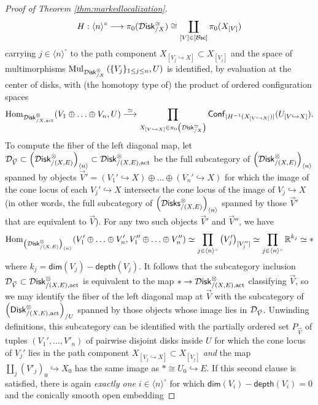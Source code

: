 \documentclass[10pt, reqno, twoside
, final
]{amsart}
\numberwithin{equation}{subsection}%
\theoremstyle{definition}
\theoremstyle{definition}
\theoremstyle{definition}
\theoremstyle{definition}
\theoremstyle{definition}
\theoremstyle{definition}
\theoremstyle{definition}
\theoremstyle{definition}
\theoremstyle{definition}
\theoremstyle{plain}
\theoremstyle{definition}
\theoremstyle{plain}
\theoremstyle{definition}
\theoremstyle{plain}
\theoremstyle{definition}
\theoremstyle{definition}
\theoremstyle{plain}
\theoremstyle{plain}
\theoremstyle{definition}
\theoremstyle{plain}
\theoremstyle{plain}
\theoremstyle{plain}
\begin{document}
\begin{proof}[Proof of Theorem \ref{thm:markedlocalization}]
\[ H:\langle n\rangle^{\circ} \longrightarrow \pi_0(\mathcal{D}\mathsf{isk}^{\simeq}_{/X})\cong \coprod_{[V]\in[\mathcal{B}\mathsf{sc}]}\pi_0(X_{[V]})   \]
carrying $j\in \langle n\rangle^{\circ}$ to the path component $X_{[V_j\hookrightarrow X ]} \subset X_{[V_j]}$ and the space of multimorphisms $\mathrm{Mul}_{\mathcal{D}\mathsf{isk}_{/X}^{\otimes}}\left(\{V_j\}_{1\leq j\leq n},U\right)$ is identified, by evaluation at the center of disks, with (the homotopy type of) the product of ordered configuration spaces
\[ \mathrm{Hom}_{\mathcal{D}\mathsf{isk}_{/X,\mathrm{act}}^{\otimes} }(V_1\oplus \ldots\oplus V_n,U)  \overset{\simeq}{\longrightarrow} \prod_{X_{[V\hookrightarrow X]}\in\pi_0\left(\mathcal{D}\mathsf{isk}^{\simeq}_{/X}\right)} \mathsf{Conf}_{|H^{-1}(X_{[V\hookrightarrow X]})|}(U_{[V\hookrightarrow X]}). \]
To compute the fiber of the left diagonal map, let $\mathcal{D}_{\vec{V}}\subset \left(\mathcal{D}\mathsf{isk}^{\otimes}_{/(X,E)}\right)_{\langle n\rangle}\subset \mathcal{D}\mathsf{isk}_{/(X,E),\mathrm{act}}^{\otimes}$ be the full subcategory of $\left(\mathcal{D}\mathsf{isk}^{\otimes}_{/(X,E)}\right)_{\langle n\rangle}$ spanned by objects $\vec{V}'=(V_1'\hookrightarrow X)\oplus\ldots \oplus (V_n'\hookrightarrow X)$ for which the image of the cone locus of each $V_j'\hookrightarrow X$ intersects the cone locus of the image of $V_j\hookrightarrow X$ (in other words, the full subcategory of $\left(\mathcal{D}\mathsf{isks}_{/(X,E)}^{\otimes}\right)_{\langle n\rangle}$ spanned by those $\vec{V}'$ that are equivalent to $\vec{V}$). For any two such objects $\vec{V}'$ and $\vec{V}''$, we have 
\begin{equation}\label{eq:vmaps}   \mathrm{Hom}_{\left(\mathcal{D}\mathsf{isk}^{\otimes}_{/(X,E)}\right)_{\langle n\rangle}}(V'_1\oplus \ldots\oplus V'_n,V''_1\oplus\ldots\oplus V''_n) \simeq \prod_{j\in\langle n\rangle^{\circ}} \left(V_j'\right)_{[V_j'']} \simeq \prod_{j\in\langle n\rangle^{\circ}} \mathbb{R}^{k_j}\simeq *   \end{equation}
where $k_j=\mathsf{dim}(V_j)-\mathsf{depth}(V_j)$. It follows that the subcategory inclusion $\mathcal{D}_{\vec{V}}\subset \mathcal{D}\mathsf{isk}_{/(X,E),\mathrm{act}}^{\otimes}$ is equivalent to the map $*\rightarrow \mathcal{D}\mathsf{isk}_{/(X,E),\mathrm{act}}^{\otimes}$ classifying $\vec{V}$, so we may identify the fiber of the left diagonal map at $\vec{V}$ with the subcategory of $\left(\mathsf{Disk}_{/(X,E),\mathrm{act}}^{\otimes}\right)_{/U}$ spanned by those objects whose image lies in $\mathcal{D}_{\vec{V}}$. Unwinding definitions, this subcategory can be identified with the partially ordered set $P_{\vec{V}}$ of tuples $(V_1',\ldots,V'_n)$ of pairwise disjoint disks inside $U$ for which the cone locus of $V_j'$ lies in the path component $X_{[V_j\hookrightarrow X]}\subset X_{[V_j]}$ \emph{and} the map $\coprod_j (V'_j)_0\hookrightarrow X_0$ has the same image as $*\cong U_0\hookrightarrow E$. If this second clause is satisfied, there is again \emph{exactly one} $i\in \langle n\rangle^{\circ}$ for which $\mathsf{dim}(V_i)-\mathsf{depth}(V_i)=0$ and the conically smooth open embedding

\end{proof}
\end{document}
